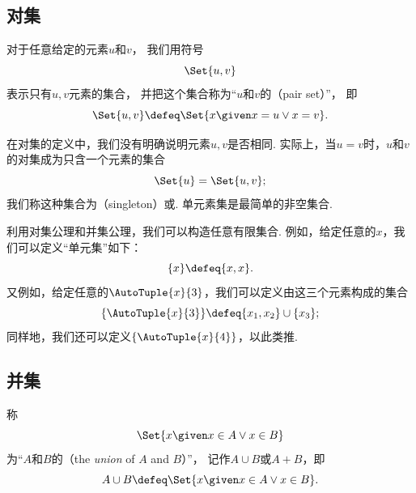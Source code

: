 \subsection{对集}
\begin{definition}
对于任意给定的元素\(u\)和\(v\)，
我们用符号\begin{equation*}
	\Set{ u, v }
\end{equation*}表示只有\(u,v\)元素的集合，
并把这个集合称为“\(u\)和\(v\)的（pair set）”，
即\begin{equation*}
	\Set{ u, v } \defeq \Set{ x \given x = u \lor x = v }.
\end{equation*}
\end{definition}
在对集的定义中，我们没有明确说明元素\(u,v\)是否相同.
实际上，当\(u=v\)时，\(u\)和\(v\)的对集成为只含一个元素的集合\begin{equation*}
	\Set{ u } = \Set{ u, v };
\end{equation*}
我们称这种集合为（singleton）或.
单元素集是最简单的非空集合.

利用对集公理和并集公理，我们可以构造任意有限集合.
例如，给定任意的\(x\)，我们可以定义“单元集”如下：\begin{equation*}
\{x\} \defeq \{x, x\}.
\end{equation*}
又例如，给定任意的\(\AutoTuple{x}{3}\)，我们可以定义由这三个元素构成的集合
\begin{equation*}
	\{\AutoTuple{x}{3}\} \defeq \{x_1,x_2\}\cup\{x_3\};
\end{equation*}
同样地，我们还可以定义\(\{\AutoTuple{x}{4}\}\)，以此类推.


\subsection{并集}
\begin{definition}
称\begin{equation*}
	\Set{ x \given x \in A \lor x \in B }
\end{equation*}为“\(A\)和\(B\)的（the \emph{union} of \(A\) and \(B\)）”，
记作\(A \cup B\)或\(A+B\)，即\begin{equation*}
	A \cup B \defeq \Set{ x \given x \in A \lor x \in B }.
\end{equation*}
\end{definition}


